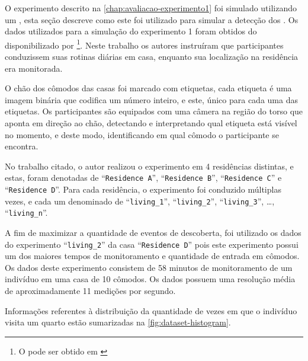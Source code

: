O experimento descrito na \autoref{chap:avaliacao-experimento1} foi simulado utilizando um \dataset{}, esta seção descreve como este \dataset{} foi utilizado para simular a detecção dos \beacons{}. Os dados utilizados para a simulação do experimento 1 foram obtidos do \dataset{} disponibilizado por \footnote{O \dataset{} pode ser obtido em \cite{byrne2019dataset}}. Neste trabalho os autores instruíram que participantes conduzissem suas rotinas diárias em casa, enquanto sua localização na residência era monitorada.

O chão dos cômodos das casas foi marcado com etiquetas, cada etiqueta é uma imagem binária que codifica um número inteiro, e este, único para cada uma das etiquetas. Os participantes são equipados com uma câmera na região do torso que aponta em direção ao chão, detectando e interpretando qual etiqueta está visível no momento, e deste modo, identificando em qual cômodo o participante se encontra.

No trabalho citado, o autor realizou o experimento em 4 residências distintas, e estas, foram denotadas de ``\texttt{Residence A}'', ``\texttt{Residence B}'', ``\texttt{Residence C}'' e ``\texttt{Residence D}''. Para cada residência, o experimento foi conduzido múltiplas vezes, e cada um denominado de ``\texttt{living\_1}'', ``\texttt{living\_2}'', ``\texttt{living\_3}'', \dots{}, ``\texttt{living\_n}''.


A fim de maximizar a quantidade de eventos de descoberta, foi utilizado os dados do experimento ``\texttt{living\_2}'' da casa ``\texttt{Residence D}'' pois este experimento possui um dos maiores tempos de monitoramento e quantidade de entrada em cômodos. Os dados deste experimento consistem de 58 minutos de monitoramento de um indivíduo em uma casa de 10 cômodos. Os dados possuem uma resolução média de aproximadamente 11 medições por segundo.

Informações referentes à distribuição da quantidade de vezes em que o indivíduo visita um quarto estão sumarizadas na \autoref{fig:dataset-histogram}.

